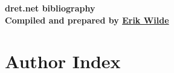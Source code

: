 \documentclass[10pt,a4paper]{article}
\def\doctitle{dret.net bibliography}
\def\docauthor{Erik Wilde}
\begin{document}
\begin{centering}
\vspace*{7mm}
{\huge\bf\doctitle}\\
\vspace*{7mm}
{\large\bf Compiled and prepared by \href{http://dret.net/netdret/}{\docauthor}}\\
\vspace*{10mm}
\end{centering}

\nocite{*}

\def\authorstyle#1{{\sc #1}}




\renewcommand{\aipages}[1]{[{#1}]}
\section*{Author Index}

\begin{multicols}{2}
\printauthorindex
\end{multicols}
\end{document}
